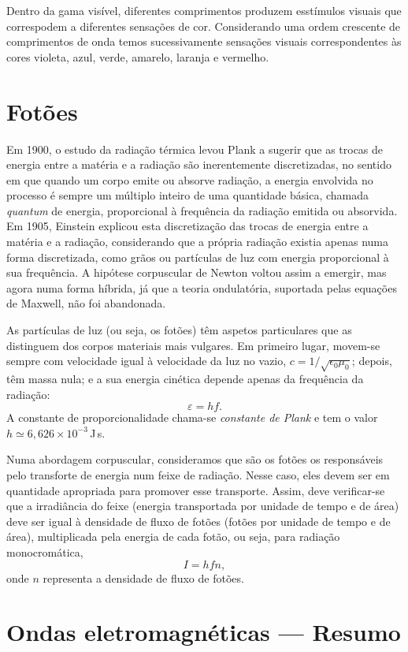 Dentro da gama visível, diferentes comprimentos produzem esstímulos visuais que
correspodem a diferentes sensações de cor. Considerando uma ordem crescente de
comprimentos de onda temos sucessivamente sensações visuais correspondentes às
cores violeta, azul, verde, amarelo, laranja e vermelho.



\section{Fotões}
Em 1900, o estudo da radiação térmica levou Plank a sugerir que as trocas de
energia entre a matéria e a radiação são inerentemente discretizadas, no sentido
em que quando um corpo emite ou absorve radiação, a energia envolvida no
processo é sempre um múltiplo inteiro de uma quantidade básica, chamada
\emph{quantum} de energia, proporcional à frequência da radiação emitida ou
absorvida. Em 1905, Einstein explicou esta discretização das trocas de energia
entre a matéria e a radiação, considerando que a própria radiação existia
apenas numa forma discretizada, como grãos ou partículas de luz com energia
proporcional à sua frequência. A hipótese corpuscular de Newton voltou assim a
emergir, mas agora numa forma híbrida, já que a teoria ondulatória, suportada
pelas equações de Maxwell, não foi abandonada.

As partículas de luz (ou seja, os fotões) têm aspetos particulares que as
distinguem dos corpos materiais mais vulgares. Em primeiro lugar, movem-se
sempre com velocidade igual à velocidade da luz no vazio,
$c=1/\sqrt{\epsilon_0\mu_0}$; depois, têm massa nula; e a sua energia cinética
depende apenas da frequência da radiação:
\begin{equation*}
    \varepsilon=hf.
\end{equation*}
A constante de proporcionalidade chama-se \emph{constante de Plank} e tem o
valor $h\simeq6,626\times10^{-3}$\,J\,s.

Numa abordagem corpuscular, consideramos que são os fotões os responsáveis pelo
transforte de energia num feixe de radiação. Nesse caso, eles devem ser em
quantidade apropriada para promover esse transporte. Assim, deve verificar-se
que a irradiância do feixe (energia transportada por unidade de tempo e de área)
deve ser igual à densidade de fluxo de fotões (fotões por unidade de tempo e de
área), multiplicada pela energia de cada fotão, ou seja, para radiação
monocromática,
\begin{equation}
    I=hfn,
\end{equation}
onde $n$ representa a densidade de fluxo de fotões.


\section*{Ondas eletromagnéticas --- Resumo}

